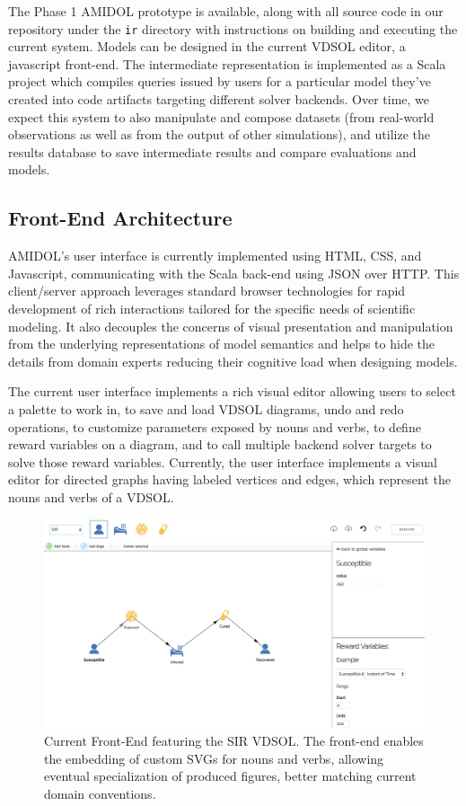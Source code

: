 \documentclass[11pt]{article}
\newcommand{\amidol}{\textsc{AMIDOL}}
\begin{document}
The Phase 1 \amidol{} prototype is available, along with all source code in our repository under the \texttt{ir} directory with instructions on building and executing the current system.  Models can be designed in the current VDSOL editor, a javascript front-end.  The intermediate representation is implemented as a Scala project which compiles queries issued by users for a particular model they've created into code artifacts targeting different solver backends. Over time, we expect this system to also manipulate and compose datasets (from real-world observations as well as from the output of other simulations), and utilize the results database to save intermediate results and compare evaluations and models.


\subsection{Front-End Architecture}

\amidol{}'s user interface is currently implemented using HTML, CSS, and Javascript, communicating with the Scala back-end using JSON over HTTP.  This client/server approach leverages standard browser technologies for rapid development of rich interactions tailored for the specific needs of scientific modeling. It also decouples the concerns of visual presentation and manipulation from the underlying representations of model semantics and helps to hide the details from domain experts reducing their cognitive load when designing models.

The current user interface implements a rich visual editor allowing users to select a palette to work in, to save and load VDSOL diagrams, undo and redo operations, to customize parameters exposed by nouns and verbs, to define reward variables on a diagram, and to call multiple backend solver targets to solve those reward variables.
Currently, the user interface implements a visual editor for directed graphs having labeled vertices and edges, which represent the nouns and verbs of a VDSOL.

\begin{figure}
\includegraphics[width=\textwidth]{figs/AMIDOL-UI.png}
\caption{Current Front-End featuring the SIR VDSOL.  The front-end enables the embedding of custom SVGs for nouns and verbs, allowing eventual specialization of produced figures, better matching current domain conventions.}
\label{Fig:Editor}
\end{figure}
\end{document}
